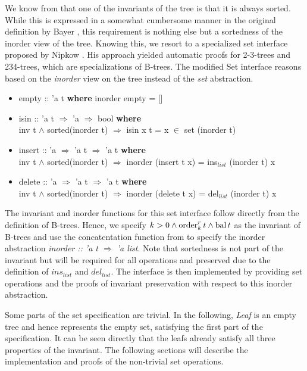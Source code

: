 We know from  that one of the invariants
of the tree is that it is always sorted.
While this is expressed in a somewhat cumbersome manner
in the original definition by Bayer \parencite{DBLP:journals/acta/BayerM72},
this requirement is nothing else but a sortedness of the inorder view of the tree.
Knowing this, we resort to a specialized set interface
proposed by Nipkow \parencite{DBLP:conf/itp/Nipkow16}.
His approach yielded automatic proofs for 2-3-trees
and 234-trees, which are specializations of B-trees.
The modified Set interface reasons based on the \textit{inorder}
view on the tree instead of the \textit{set} abstraction.

\begin{itemize}
    \itshape
    \item empty :: 'a t \textup{\textbf{where}} inorder empty = []
    \item isin :: 'a t $\Rightarrow$ 'a $\Rightarrow$ bool \textup{\textbf{where}}\\
     inv t $\wedge$ sorted(inorder t) $\Longrightarrow$ isin x t = x $\in$ set (inorder t)
    \item insert :: 'a $\Rightarrow$ 'a t $\Rightarrow$ 'a t \textup{\textbf{where}}\\
     inv t $\wedge$ sorted(inorder t) $\Longrightarrow$ inorder (insert t x) = ins$_{list}$ (inorder t) x
    \item delete :: 'a $\Rightarrow$ 'a t $\Rightarrow$ 'a t \textup{\textbf{where}}\\
     inv t $\wedge$ sorted(inorder t) $\Longrightarrow$ inorder (delete t x) = del$_{list}$ (inorder t) x
\end{itemize}

The invariant and inorder functions for this set interface
follow directly from the definition of B-trees.
Hence, we specify $k > 0 \wedge \operatorname{order}^r_k t \wedge \operatorname{bal} t$
as the invariant of B-trees and use
the concatentation function from  to specify the
inorder abstraction \textit{inorder :: 'a t $\Rightarrow$ 'a list}.
Note that sortedness is not part of the invariant
but will be required for all operations and preserved
due to the definition of $ins_{list}$ and $del_{list}$.
The interface is then implemented by providing set operations
and the proofs of invariant preservation
with respect to this inorder abstraction.

Some parts of the set specification are trivial.
In the following, \textit{Leaf} is an empty tree and hence represents
the empty set, satisfying the first part of the specification.
It can be seen directly that the leafs already satisfy all three 
properties of the invariant.
The following sections will describe the implementation 
and proofs of the non-trivial set operations.

